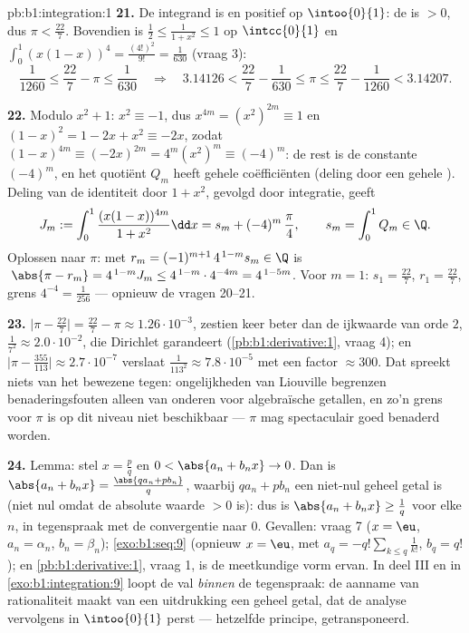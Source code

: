\begin{solution}{pb:b1:integration:1}
\textbf{21.} De integrand is  en positief op
$\intoo{0}{1}$: de  is $> 0$, dus $\pi < \frac{22}{7}$.
Bovendien is $\frac12 \leq \frac{1}{1+x^2} \leq 1$ op
$\intcc{0}{1}$ en $\int_0^1 (x(1-x))^4 = \frac{(4!)^2}{9!} =
\frac{1}{630}$ (vraag 3):
\[
\frac{1}{1260} \leq \frac{22}{7} - \pi \leq \frac{1}{630}
\quad\Longrightarrow\quad
3.14126 < \frac{22}{7} - \frac{1}{630} \leq \pi \leq
\frac{22}{7} - \frac{1}{1260} < 3.14207 .
\]

\textbf{22.} Modulo $x^2 + 1$: $x^2 \equiv -1$, dus $x^{4m} =
(x^2)^{2m} \equiv 1$ en $(1 - x)^2 = 1 - 2x + x^2 \equiv -2x$,
zodat $(1-x)^{4m} \equiv (-2x)^{2m} = 4^m (x^2)^m \equiv
(-4)^m$: de rest is de constante $(-4)^m$, en het quotiënt $Q_m$
heeft gehele coëfficiënten (deling door een  gehele
). Deling van de identiteit door $1 + x^2$, gevolgd door
integratie, geeft
\[
J_m := \int_0^1 \frac{(x(1-x))^{4m}}{1+x^2}\dd x
= s_m + (-4)^m\,\frac{\pi}{4},
\qquad s_m = \int_0^1 Q_m \in \Q .
\]
Oplossen naar $\pi$: met $r_m = (-1)^{m+1}\,4^{\,1-m} s_m \in
\Q$ is $\;\abs{\pi - r_m} = 4^{\,1-m} J_m \leq
4^{\,1-m}\cdot4^{-4m} = 4^{\,1-5m}$. Voor $m = 1$: $s_1 =
\frac{22}{7}$, $r_1 = \frac{22}{7}$, grens $4^{-4} =
\frac{1}{256}$ --- opnieuw de vragen 20--21.

\textbf{23.} $\bigl|\pi - \frac{22}{7}\bigr| = \frac{22}{7} -
\pi \approx 1.26\cdot10^{-3}$, zestien keer beter dan de
ijkwaarde van orde $2$, $\frac{1}{7^2} \approx 2.0\cdot10^{-2}$,
die Dirichlet garandeert (\cref{pb:b1:derivative:1}, vraag 4);
en $\bigl|\pi - \frac{355}{113}\bigr| \approx 2.7\cdot10^{-7}$
verslaat $\frac{1}{113^2} \approx 7.8\cdot10^{-5}$ met een
factor $\approx 300$. Dat spreekt niets van het bewezene tegen:
ongelijkheden van Liouville begrenzen benaderingsfouten alleen
van onderen voor algebraïsche getallen, en zo'n grens voor $\pi$
is op dit niveau niet beschikbaar --- $\pi$ mag spectaculair
goed benaderd worden.

\textbf{24.} Lemma: stel $x = \frac pq$ en $0 < \abs{a_n + b_n
x} \to 0$. Dan is $\abs{a_n + b_n x} = \frac{\abs{q a_n + p
b_n}}{q}$, waarbij $q a_n + p b_n$ een niet-nul geheel getal is
(niet nul omdat de absolute waarde $> 0$ is): dus is $\abs{a_n +
b_n x} \geq \frac1q$ voor elke $n$, in tegenspraak met de
convergentie naar $0$. Gevallen: vraag 7 ($x = \eu$, $a_n =
\alpha_n$, $b_n = \beta_n$); \cref{exo:b1:seq:9} (opnieuw $x =
\eu$, met $a_q = -q!\sum_{k \leq q}\frac{1}{k!}$, $b_q = q!$); en
\cref{pb:b1:derivative:1}, vraag 1, is de meetkundige vorm
ervan. In deel III en in \cref{exo:b1:integration:9} loopt de val
\emph{binnen} de tegenspraak: de aanname van rationaliteit maakt
van een uitdrukking een geheel getal, dat de analyse vervolgens
in $\intoo{0}{1}$ perst --- hetzelfde principe, getransponeerd.


\end{solution}
